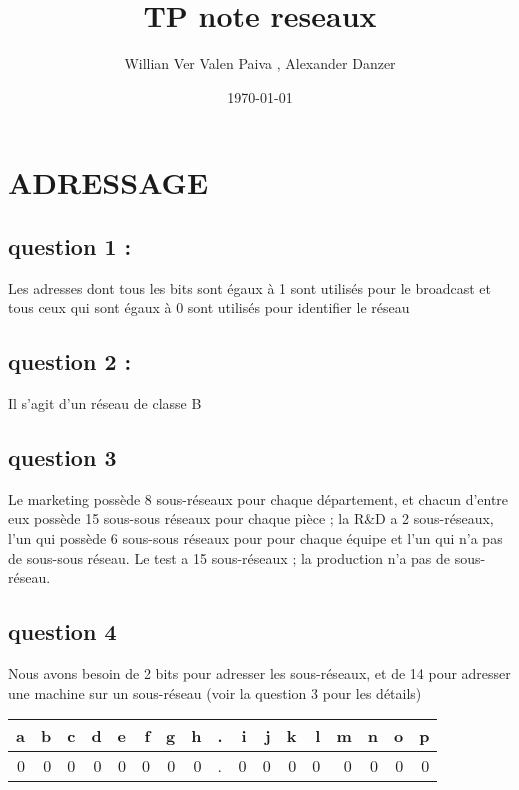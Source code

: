 \documentclass[11pt]{article}
\author{Willian Ver Valen Paiva , Alexander Danzer}
\date{\today}
\title{TP note reseaux}
\begin{document}
\maketitle
\tableofcontents


\section{ADRESSAGE}
\label{sec:orgheadline17}

\subsection{question 1 :}
\label{sec:orgheadline1}

Les adresses dont tous les bits sont égaux à 1 sont utilisés pour le broadcast
et tous ceux qui sont égaux à 0 sont utilisés pour identifier le réseau



\subsection{question 2 :}
\label{sec:orgheadline2}

Il s'agit d'un réseau de classe B


\subsection{question 3}
\label{sec:orgheadline3}

Le marketing possède 8 sous-réseaux pour chaque département, et chacun d'entre eux
possède 15 sous-sous réseaux pour chaque pièce ;
la R\&D a 2 sous-réseaux, l'un qui possède 6 sous-sous réseaux pour  pour chaque équipe et l'un qui n'a pas
de sous-sous réseau.
Le test a 15 sous-réseaux ;
la production n'a pas de sous-réseau.


\subsection{question 4}
\label{sec:orgheadline4}
Nous avons besoin de 2 bits pour adresser les sous-réseaux, et de 14 pour adresser une
machine sur un sous-réseau (voir la question 3 pour les détails)



\begin{center}
\begin{tabular}{rrrrrrrrlrrrrrrrr}
a & b & c & d & e & f & g & h & . & i & j & k & l & m & n & o & p\\
\hline
0 & 0 & 0 & 0 & 0 & 0 & 0 & 0 & . & 0 & 0 & 0 & 0 & 0 & 0 & 0 & 0\\
\end{tabular}
\end{center}
\end{document}
